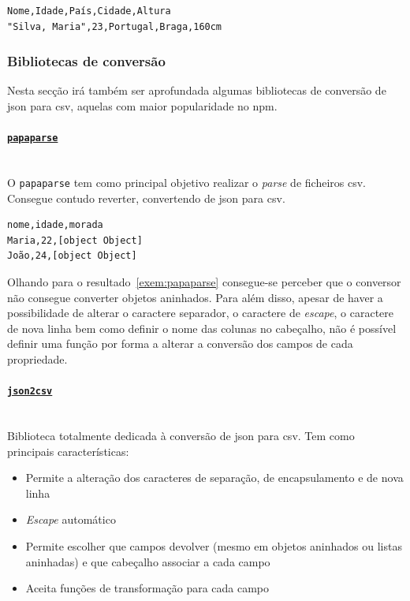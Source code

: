 \begin{lstlisting}[caption=Pequeno exemplo em \acrshort{csv}, label=exem:csvEx]
Nome,Idade,País,Cidade,Altura
"Silva, Maria",23,Portugal,Braga,160cm
\end{lstlisting}

\subsubsection{Bibliotecas de conversão}

Nesta secção irá também ser aprofundada algumas bibliotecas de conversão de \acrshort{json} para \acrshort{csv}, aquelas com maior popularidade no \acrshort{npm}.

\paragraph{\href{https://www.npmjs.com/package/papaparse}{\texttt{papaparse}}} \mbox{} \\

O \texttt{papaparse} tem como principal objetivo realizar o \textit{parse} de ficheiros \acrshort{csv}. Consegue contudo reverter, convertendo de \acrshort{json} para \acrshort{csv}.

\begin{lstlisting}[caption=Resultado da conversão do exemplo~\ref{exem:jsonBib} usando o conversor \texttt{papaparse}, label=exem:papaparse]
nome,idade,morada
Maria,22,[object Object]
João,24,[object Object]
\end{lstlisting}

Olhando para o resultado~\ref{exem:papaparse} consegue-se perceber que o conversor não consegue converter objetos aninhados. Para além disso, apesar de haver a possibilidade de alterar o caractere separador, o caractere de \textit{escape}, o caractere de nova linha bem como definir o nome das colunas no cabeçalho, não é possível definir uma função por forma a alterar a conversão dos campos de cada propriedade.

\paragraph{\href{https://www.npmjs.com/package/json2csv}{\texttt{json2csv}}} \mbox{} \\

Biblioteca totalmente dedicada à conversão de \acrshort{json} para \acrshort{csv}. Tem como principais características:
\begin{itemize}
    \item Permite a alteração dos caracteres de separação, de encapsulamento e de nova linha
    \item \textit{Escape} automático
    \item Permite escolher que campos devolver (mesmo em objetos aninhados ou listas aninhadas) e que cabeçalho associar a cada campo
    \item Aceita funções de transformação para cada campo
\end{itemize}

